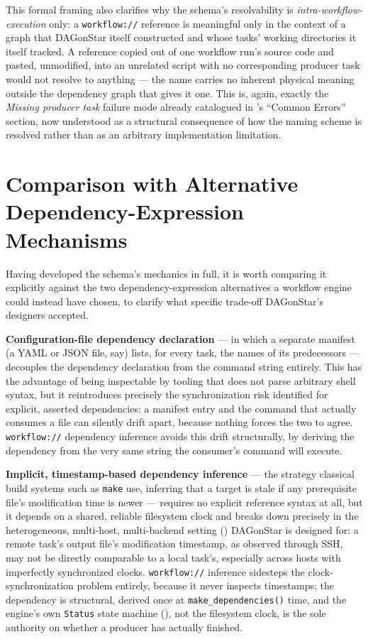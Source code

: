 This formal framing also clarifies why the schema's resolvability is
\emph{intra-workflow-execution} only: a \texttt{workflow://} reference is
meaningful only in the context of a graph that DAGonStar itself constructed
and whose tasks' working directories it itself tracked. A reference copied
out of one workflow run's source code and pasted, unmodified, into an
unrelated script with no corresponding producer task would not resolve to
anything --- the name carries no inherent physical meaning outside the
dependency graph that gives it one. This is, again, exactly the
\emph{Missing producer task} failure mode already catalogued in
's ``Common Errors'' section, now understood as a structural
consequence of how the naming scheme is resolved rather than as an
arbitrary implementation limitation.

\section{Comparison with Alternative Dependency-Expression Mechanisms}

Having developed the schema's mechanics in full, it is worth comparing it
explicitly against the two dependency-expression alternatives a workflow
engine could instead have chosen, to clarify what specific trade-off
DAGonStar's designers accepted.

\textbf{Configuration-file dependency declaration} --- in which a separate
manifest (a YAML or JSON file, say) lists, for every task, the names of its
predecessors --- decouples the dependency declaration from the command
string entirely. This has the advantage of being inspectable by tooling that
does not parse arbitrary shell syntax, but it reintroduces precisely the
synchronization risk  identified for explicit,
asserted dependencies: a manifest entry and the command that actually
consumes a file can silently drift apart, because nothing forces the two to
agree. \texttt{workflow://} dependency inference avoids this drift
structurally, by deriving the dependency from the very same string the
consumer's command will execute.

\textbf{Implicit, timestamp-based dependency inference} --- the strategy
classical build systems such as \texttt{make} use, inferring that a target
is stale if any prerequisite file's modification time is newer --- requires
no explicit reference syntax at all, but it depends on a shared, reliable
filesystem clock and breaks down precisely in the heterogeneous,
multi-host, multi-backend setting () DAGonStar is designed
for: a remote task's output file's modification timestamp, as observed
through SSH, may not be directly comparable to a local task's, especially
across hosts with imperfectly synchronized clocks. \texttt{workflow://}
inference sidesteps the clock-synchronization problem entirely, because it
never inspects timestamps; the dependency is structural, derived once at
\texttt{make\_dependencies()} time, and the engine's own
\texttt{Status} state machine (), not the filesystem
clock, is the sole authority on whether a producer has actually finished.

